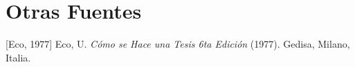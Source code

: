 \setcounter{chapter}{6}
\chapter{Otras Fuentes}
[Eco, 1977] Eco, U. \textit{Cómo se Hace una Tesis 6ta Edición} (1977). Gedisa, Milano, Italia.
